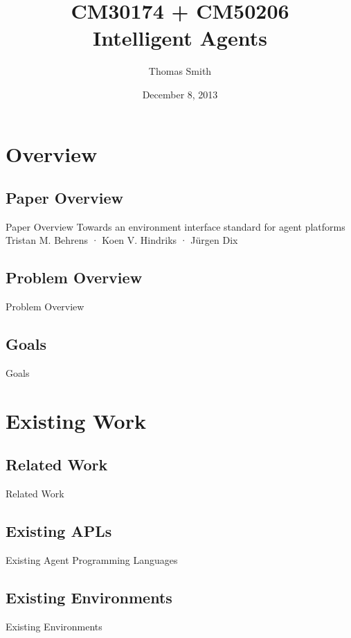 \documentclass{beamer}
\author[TAES]{Thomas Smith}
\title[CM30174/CM50206]{CM30174 + CM50206\\Intelligent Agents}
\institute[Bath/CS]{East Building}
\date{December 8, 2013}
\begin{document}
\begin{frame}
  \titlepage
\end{frame}

\section{Overview}
\subsection{Paper Overview}
\begin{frame}{Paper Overview}
Towards an environment interface standard for agent platforms
Tristan M. Behrens · Koen V. Hindriks · Jürgen Dix
\end{frame}
\subsection{Problem Overview}
\begin{frame}{Problem Overview}
\end{frame}
\subsection{Goals}
\begin{frame}{Goals}
\end{frame}
\section{Existing Work}
\subsection{Related Work}
\begin{frame}{Related Work}
\end{frame}
\subsection{Existing APLs}
\begin{frame}{Existing Agent Programming Languages}
\end{frame}
\subsection{Existing Environments}
\begin{frame}{Existing Environments}
\end{frame}
\end{document}
